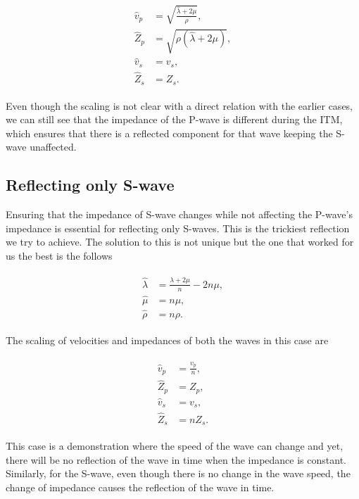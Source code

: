 \begin{align}
    \begin{split}
        \hat{v}_p &= \sqrt{\frac{\hat{\lambda} + 2 \mu}{\rho}} ,\\
        \hat{Z}_p &= \sqrt{\rho\left(\hat{\lambda} + 2 \mu \right)} ,\\
        \hat{v}_s &= v_s ,\\
        \hat{Z}_s &= Z_s . 
    \end{split}
\end{align}

Even though the scaling is not clear with a direct relation with the earlier cases, we can still see that the impedance of the P-wave is different during the \ac{ITM}, 
which ensures that there is a reflected component for that wave keeping the S-wave unaffected. \\

\subsection{Reflecting only S-wave}\label{sec:reflecting_s}

Ensuring that the impedance of S-wave changes while not affecting the P-wave's impedance is essential for reflecting only S-waves. This is the trickiest
reflection we try to achieve. The solution to this is not unique but the one that worked for us the best is the follows

\begin{align}
    \begin{split}
        \hat{\lambda} &= \frac{\lambda + 2 \mu}{n} -  2n \mu ,\\
        \hat{\mu} &= n \mu ,\\
        \hat{\rho} &= n \rho .
    \end{split}
\end{align}

The scaling of velocities and impedances of both the waves in this case are 

\begin{align}
    \begin{split}
        \hat{v}_p &= \frac{v_p}{n} ,\\
        \hat{Z}_p &= Z_p ,\\
        \hat{v}_s &= v_s ,\\
        \hat{Z}_s &= n Z_s .
    \end{split}
\end{align}

This case is a demonstration where the speed of the wave can change and yet, there will be no reflection of the wave in time when the impedance is constant.
Similarly, for the S-wave, even though there is no change in the wave speed, the change of impedance causes the reflection of the wave in time. \\


